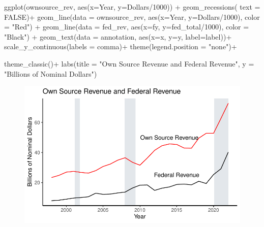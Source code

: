 \documentclass[
  letterpaper,
  DIV=11,
  numbers=noendperiod]{scrreport}
\newenvironment{Shaded}{\begin{snugshade}}{\end{snugshade}}
\newcommand{\AttributeTok}[1]{\textcolor[rgb]{0.40,0.45,0.13}{#1}}
\newcommand{\ConstantTok}[1]{\textcolor[rgb]{0.56,0.35,0.01}{#1}}
\newcommand{\DecValTok}[1]{\textcolor[rgb]{0.68,0.00,0.00}{#1}}
\newcommand{\FunctionTok}[1]{\textcolor[rgb]{0.28,0.35,0.67}{#1}}
\newcommand{\NormalTok}[1]{\textcolor[rgb]{0.00,0.23,0.31}{#1}}
\newcommand{\SpecialCharTok}[1]{\textcolor[rgb]{0.37,0.37,0.37}{#1}}
\newcommand{\StringTok}[1]{\textcolor[rgb]{0.13,0.47,0.30}{#1}}
\begin{document}
\begin{Shaded}
\begin{Highlighting}[]
\FunctionTok{ggplot}\NormalTok{(ownsource\_rev, }\FunctionTok{aes}\NormalTok{(}\AttributeTok{x=}\NormalTok{Year, }\AttributeTok{y=}\NormalTok{Dollars}\SpecialCharTok{/}\DecValTok{1000}\NormalTok{)) }\SpecialCharTok{+} 
  \FunctionTok{geom\_recessions}\NormalTok{( }\AttributeTok{text =} \ConstantTok{FALSE}\NormalTok{)}\SpecialCharTok{+}
  \FunctionTok{geom\_line}\NormalTok{(}\AttributeTok{data =}\NormalTok{ ownsource\_rev, }\FunctionTok{aes}\NormalTok{(}\AttributeTok{x=}\NormalTok{Year, }\AttributeTok{y=}\NormalTok{Dollars}\SpecialCharTok{/}\DecValTok{1000}\NormalTok{), }\AttributeTok{color =} \StringTok{"Red"}\NormalTok{) }\SpecialCharTok{+} 
  \FunctionTok{geom\_line}\NormalTok{(}\AttributeTok{data =}\NormalTok{ fed\_rev, }\FunctionTok{aes}\NormalTok{(}\AttributeTok{x=}\NormalTok{fy, }\AttributeTok{y=}\NormalTok{fed\_total}\SpecialCharTok{/}\DecValTok{1000}\NormalTok{), }\AttributeTok{color =} \StringTok{"Black"}\NormalTok{) }\SpecialCharTok{+} 
    \FunctionTok{geom\_text}\NormalTok{(}\AttributeTok{data =}\NormalTok{ annotation, }\FunctionTok{aes}\NormalTok{(}\AttributeTok{x=}\NormalTok{x, }\AttributeTok{y=}\NormalTok{y, }\AttributeTok{label=}\NormalTok{label))}\SpecialCharTok{+}
    \FunctionTok{scale\_y\_continuous}\NormalTok{(}\AttributeTok{labels =}\NormalTok{ comma)}\SpecialCharTok{+}
  \FunctionTok{theme}\NormalTok{(}\AttributeTok{legend.position =} \StringTok{"none"}\NormalTok{)}\SpecialCharTok{+}

  \FunctionTok{theme\_classic}\NormalTok{()}\SpecialCharTok{+}
  \FunctionTok{labs}\NormalTok{(}\AttributeTok{title =} \StringTok{"Own Source Revenue and Federal Revenue"}\NormalTok{, }
  \AttributeTok{y =} \StringTok{"Billions of Nominal Dollars"}\NormalTok{)}
\end{Highlighting}
\end{Shaded}

\begin{figure}[H]

{\centering \includegraphics{./Everything_files/figure-pdf/unnamed-chunk-14-1.pdf}

}

\end{figure}
\end{document}
